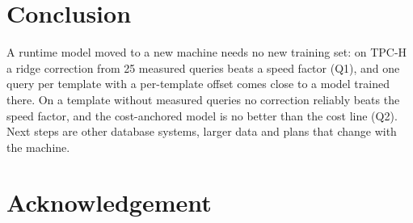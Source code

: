 \documentclass{article}
\begin{document}
\section{Conclusion}
A runtime model moved to a new machine needs no new training set: on TPC-H a ridge correction from 25 measured queries beats a speed factor (Q1), and one query per template with a per-template offset comes close to a model trained there. On a template without measured queries no correction reliably beats the speed factor, and the cost-anchored model is no better than the cost line (Q2). Next steps are other database systems, larger data and plans that change with the machine.

\clearpage
\section*{Acknowledgement}

\renewcommand*{\bibfont}{\small}
\setlength{\bibitemsep}{0.3\baselineskip}
\printbibliography[title=References]
\end{document}
